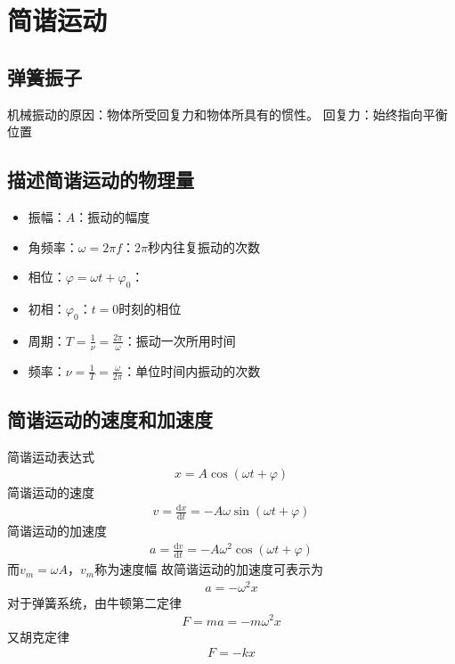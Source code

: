 \documentclass[12pt, a4paper, oneside]{ctexbook}
\begin{document}
\section{简谐运动}
\subsection{弹簧振子}
机械振动的原因：物体所受回复力和物体所具有的惯性。
回复力：始终指向平衡位置
\subsection{描述简谐运动的物理量}
\begin{itemize}
    \item 振幅：$A$：振动的幅度
    \item 角频率：$\omega = 2\pi f$：2$\pi$秒内往复振动的次数
    \item 相位：$\varphi = \omega t + \varphi_0$：
    \item 初相：$\varphi_0$：$t = 0$时刻的相位
    \item 周期：$T = \frac{1}{\nu} = \frac{2\pi}{\omega}$：振动一次所用时间
    \item 频率：$\nu = \frac{1}{T} = \frac{\omega}{2\pi}$：单位时间内振动的次数
\end{itemize}
\subsection{简谐运动的速度和加速度}
简谐运动表达式
\begin{align*}
    x = A\cos(\omega t + \varphi)
\end{align*}
简谐运动的速度
\begin{align*}
    v = \frac{\mathrm{d}x}{\mathrm{d}t} = -A\omega\sin(\omega t + \varphi)
\end{align*}
简谐运动的加速度
\begin{align*}
    a = \frac{\mathrm{d}v}{\mathrm{d}t} = -A\omega^2\cos(\omega t + \varphi)
\end{align*}
而$v_m = \omega A$，$v_m$称为速度幅
故简谐运动的加速度可表示为
\begin{align*}
    a = -\omega^2x
\end{align*}
对于弹簧系统，由牛顿第二定律
\begin{align*}
    F = ma = -m\omega^2x
\end{align*}
又胡克定律
\begin{align*}
    F = -kx
\end{align*}
\end{document}
